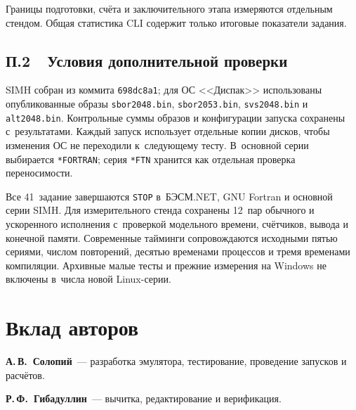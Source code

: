 \documentclass[a4paper,12pt]{article}
\begin{document}
Границы подготовки, счёта и заключительного этапа измеряются отдельным стендом. Общая статистика CLI содержит только итоговые показатели задания.

\subsection*{\protect\rmfamily П.2\ \ Условия дополнительной проверки}

SIMH собран из коммита \texttt{698dc8a1}; для ОС <<Диспак>> использованы опубликованные образы \texttt{sbor2048.bin}, \texttt{sbor2053.bin}, \texttt{svs2048.bin} и \texttt{alt2048.bin}. Контрольные суммы образов и конфигурации запуска сохранены с~результатами. Каждый запуск использует отдельные копии дисков, чтобы изменения ОС не переходили к~следующему тесту. В~основной серии выбирается \texttt{*FORTRAN}; серия \texttt{*FTN} хранится как отдельная проверка переносимости.

Все 41~задание завершаются \texttt{STOP} в~БЭСМ.NET, GNU Fortran и основной серии SIMH. Для измерительного стенда сохранены 12~пар обычного и ускоренного исполнения с~проверкой модельного времени, счётчиков, вывода и конечной памяти. Современные тайминги сопровождаются исходными пятью сериями, числом повторений, десятью временами процессов и тремя временами компиляции. Архивные малые тесты и прежние измерения на Windows не включены в~числа новой Linux-серии.

\section*{\protect\rmfamily Вклад авторов}
\noindent\textbf{А.\,В.~Солопий}~--- разработка эмулятора, тестирование, проведение запусков и расчётов.

\smallskip\noindent
\textbf{Р.\,Ф.~Гибадуллин}~--- вычитка, редактирование и верификация.

\end{document}
